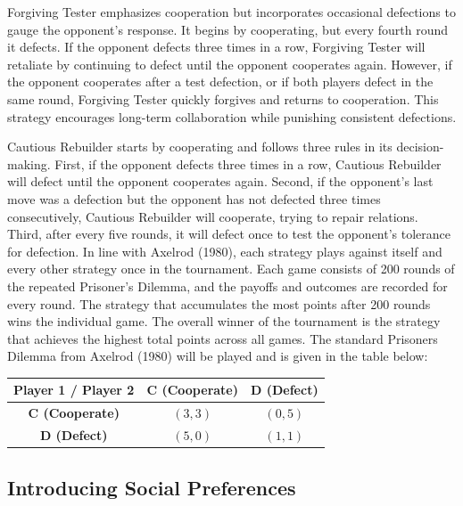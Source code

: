 \documentclass[11pt,preprint]{elsarticle}
\let\origtable\table
\let\endorigtable\endtable
\renewenvironment{table}[1][2] {
    \expandafter\origtable\expandafter[H]
} {
    \endorigtable
}
\numberwithin{equation}{section}
\numberwithin{figure}{section}
\numberwithin{table}{section}
\begin{document}
Forgiving Tester emphasizes cooperation but incorporates occasional
defections to gauge the opponent's response. It begins by cooperating,
but every fourth round it defects. If the opponent defects three times
in a row, Forgiving Tester will retaliate by continuing to defect until
the opponent cooperates again. However, if the opponent cooperates after
a test defection, or if both players defect in the same round, Forgiving
Tester quickly forgives and returns to cooperation. This strategy
encourages long-term collaboration while punishing consistent
defections.

Cautious Rebuilder starts by cooperating and follows three rules in its
decision-making. First, if the opponent defects three times in a row,
Cautious Rebuilder will defect until the opponent cooperates again.
Second, if the opponent's last move was a defection but the opponent has
not defected three times consecutively, Cautious Rebuilder will
cooperate, trying to repair relations. Third, after every five rounds,
it will defect once to test the opponent's tolerance for defection. In
line with Axelrod (1980), each strategy plays against itself and every
other strategy once in the tournament. Each game consists of 200 rounds
of the repeated Prisoner's Dilemma, and the payoffs and outcomes are
recorded for every round. The strategy that accumulates the most points
after 200 rounds wins the individual game. The overall winner of the
tournament is the strategy that achieves the highest total points across
all games. The standard Prisoners Dilemma from Axelrod (1980) will be
played and is given in the table below:

\begin{table}[ht]
\centering
\begin{tabular}{|c|c|c|}
\hline
\textbf{Player 1 / Player 2} & \textbf{C (Cooperate)} & \textbf{D (Defect)} \\
\hline
\textbf{C (Cooperate)} & $(3, 3)$ & $(0, 5)$ \\
\hline
\textbf{D (Defect)} & $(5, 0)$ & $(1, 1)$ \\
\hline
\end{tabular}
\caption{Prisoner's Dilemma Payoff Matrix}
\end{table}

\subsection{Introducing Social
Preferences}\label{introducing-social-preferences}
\end{document}
